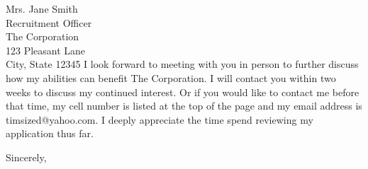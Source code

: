 \documentclass[11pt]{letter} %
\begin{document}
\begin{letter}{Mrs. Jane Smith \\
Recruitment Officer \\
The Corporation \\
123 Pleasant Lane \\
City, State 12345}
I look forward to meeting with you in person to further discuss how my abilities
can benefit The Corporation. I will contact you within two weeks to discuss my
continued interest. Or if you would like to contact me before that time, my cell
number is listed at the top of the page and my email address is timsized@yahoo.com.
I deeply appreciate the time spend reviewing my application thus far.

\closing{Sincerely,}




\end{letter}
\end{document}
